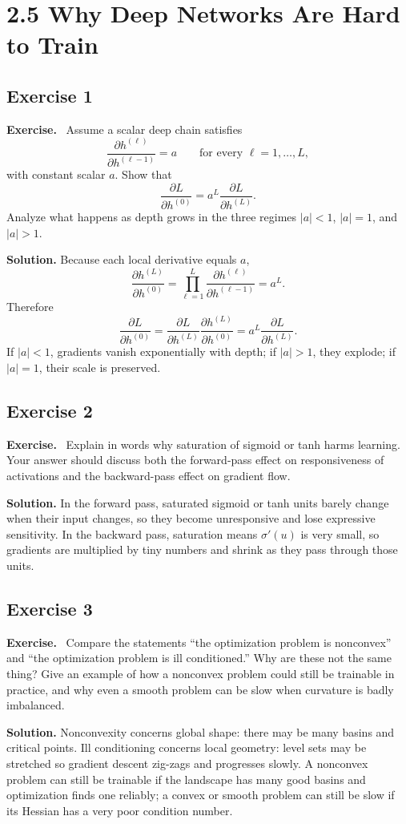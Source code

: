 \documentclass[11pt]{article}
\newenvironment{exercisebox}{\begin{framed}\noindent\textbf{Exercise.}\ }{\end{framed}}
\begin{document}
\section{2.5 Why Deep Networks Are Hard to Train}
\subsection*{Exercise 1}
\begin{exercisebox}
Assume a scalar deep chain satisfies
\[
\frac{\partial h^{(\ell)}}{\partial h^{(\ell-1)}}=a
\qquad\text{for every }\ell=1,\dots,L,
\]
with constant scalar \(a\).
Show that
\[
\frac{\partial L}{\partial h^{(0)}}
=
a^L\frac{\partial L}{\partial h^{(L)}}.
\]
Analyze what happens as depth grows in the three regimes \(|a|<1\), \(|a|=1\), and \(|a|>1\).
\end{exercisebox}
\textbf{Solution.} Because each local derivative equals $a$,
\[
\frac{\partial h^{(L)}}{\partial h^{(0)}}=\prod_{\ell=1}^L \frac{\partial h^{(\ell)}}{\partial h^{(\ell-1)}}=a^L.
\]
Therefore
\[
\frac{\partial L}{\partial h^{(0)}}=\frac{\partial L}{\partial h^{(L)}}\frac{\partial h^{(L)}}{\partial h^{(0)}}=a^L\frac{\partial L}{\partial h^{(L)}}.
\]
If $|a|<1$, gradients vanish exponentially with depth; if $|a|>1$, they explode; if $|a|=1$, their scale is preserved.

\subsection*{Exercise 2}
\begin{exercisebox}
Explain in words why saturation of sigmoid or tanh harms learning.
Your answer should discuss both the forward-pass effect on responsiveness of activations and the backward-pass effect on gradient flow.
\end{exercisebox}
\textbf{Solution.} In the forward pass, saturated sigmoid or tanh units barely change when their input changes, so they become unresponsive and lose expressive sensitivity. In the backward pass, saturation means $\sigma'(u)$ is very small, so gradients are multiplied by tiny numbers and shrink as they pass through those units.

\subsection*{Exercise 3}
\begin{exercisebox}
Compare the statements ``the optimization problem is nonconvex'' and ``the optimization problem is ill conditioned.''
Why are these not the same thing?
Give an example of how a nonconvex problem could still be trainable in practice, and why even a smooth problem can be slow when curvature is badly imbalanced.
\end{exercisebox}
\textbf{Solution.} Nonconvexity concerns global shape: there may be many basins and critical points. Ill conditioning concerns local geometry: level sets may be stretched so gradient descent zig-zags and progresses slowly. A nonconvex problem can still be trainable if the landscape has many good basins and optimization finds one reliably; a convex or smooth problem can still be slow if its Hessian has a very poor condition number.
\end{document}

